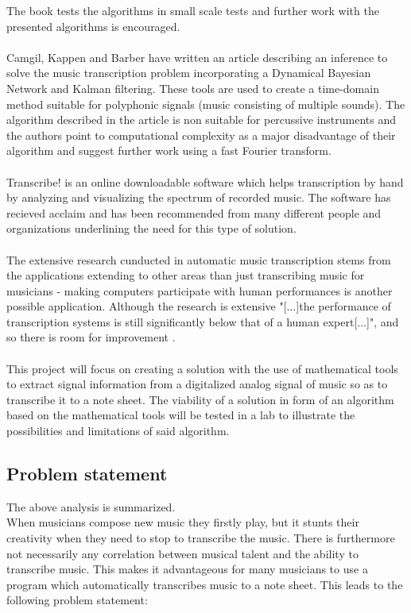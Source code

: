 The book tests the algorithms in small scale tests and further work with the presented algorithms is encouraged.
\\\\
Camgil, Kappen and Barber have written an article \cite{sol2} describing an inference to solve the music transcription problem incorporating a Dynamical Bayesian Network and Kalman filtering. These tools are used to create a time-domain method suitable for polyphonic signals (music consisting of multiple sounds). The algorithm described in the article is non suitable for percussive instruments and the authors point to computational complexity as a major disadvantage of their algorithm and suggest further work using a fast Fourier transform.
\\\\
Transcribe! \cite{transcribe!} is an online downloadable software which helps transcription by hand by analyzing and visualizing the spectrum of recorded music. The software has recieved acclaim and has been recommended from many different people and organizations underlining the need for this type of solution.
\\\\
The extensive research cunducted in automatic music transcription stems from the applications extending to other areas than just transcribing music for musicians - making computers participate with human performances is another possible application. Although the research is extensive "[$\ldots$]the performance of transcription systems is still significantly below that of a human expert[$\ldots$]", and so there is room for improvement \cite{future}.
\\\\
This project will focus on creating a solution with the use of mathematical tools to extract signal information from a digitalized analog signal of music so as to transcribe it to a note sheet. The viability of a solution in form of an algorithm based on the mathematical tools will be tested in a lab to illustrate the possibilities and limitations of said algorithm. 
\subsection{Problem statement}
The above analysis is summarized.\\
When musicians compose new music they firstly play, but it stunts their creativity when they need to stop to transcribe the music. There is furthermore not necessarily any correlation between musical talent and the ability to transcribe music. This makes it advantageous for many musicians to use a program which automatically transcribes music to a note sheet. This leads to the following problem statement:

